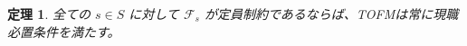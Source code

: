\documentclass[12pt, a4paper]{article}
\theoremstyle{definition}
\theoremstyle{remark}
\theoremstyle{plain}
\newtheorem{theorem}{定理}
\begin{document}

\begin{theorem}
  全ての $s \in S$ に対して $\mathcal{F}_s$ が定員制約であるならば、TOFMは常に現職必置条件を満たす。
\end{theorem}
\end{document}
